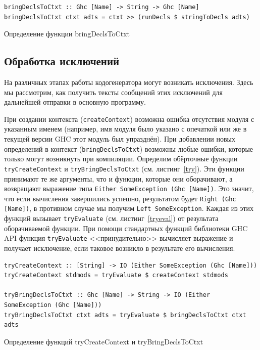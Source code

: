 \begin{ListingEnv}[h]
	\begin{lstlisting}
bringDeclsToCtxt :: Ghc [Name] -> String -> Ghc [Name]
bringDeclsToCtxt ctxt adts = ctxt >> (runDecls $ stringToDecls adts)
	\end{lstlisting}
	\caption{Определение функции bringDeclsToCtxt}\label{bringDecls}
\end{ListingEnv}		
	
	\subsection{Обработка исключений}
	На различных этапах работы кодогенератора могут возникать исключения. Здесь мы рассмотрим, как получить тексты сообщений этих исключений для дальнейшей отправки в основную программу.
	
	При создании контекста (\lstinline!createContext!) возможна ошибка отсутствия модуля с указанным именем (например, имя модуля было указано с опечаткой или же в текущей версии GHC этот модуль был упразднён). При добавлении новых определений в контекст (\lstinline!bringDeclsToCtxt!) возможны любые ошибки, которые только могут возникнуть при компиляции. Определим обёрточные функции \lstinline!tryCreateContext! и \lstinline!tryBringDeclsToCtxt! (см. листинг~\ref{try}). Эти функции принимают те же аргументы, что и функции, которые они оборачивают, а возвращают выражение типа \lstinline!Either SomeException (Ghc [Name])!. Это значит, что если вычисления завершились успешно, результатом будет \lstinline!Right (Ghc [Name])!, в противном случае мы получим \lstinline!Left SomeException!. Каждая из этих функций вызывает \lstinline!tryEvaluate! (см. листинг~\ref{tryeval}) от результата оборачиваемой функции. При помощи стандартных функций библиотеки GHC API функция \lstinline!tryEvaluate! <<принудительно>> вычисляет выражение и получает исключение, если таковое возникло в результате его вычисления.

\begin{ListingEnv}[h]
	\begin{lstlisting}
tryCreateContext :: [String] -> IO (Either SomeException (Ghc [Name]))
tryCreateContext stdmods = tryEvaluate $ createContext stdmods

tryBringDeclsToCtxt :: Ghc [Name] -> String -> IO (Either SomeException (Ghc [Name]))
tryBringDeclsToCtxt ctxt adts = tryEvaluate $ bringDeclsToCtxt ctxt adts
	\end{lstlisting}
	\caption{Определение функций tryCreateContext и tryBringDeclsToCtxt}\label{try}
\end{ListingEnv}	

